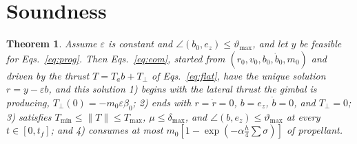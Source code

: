 \documentclass[10pt,letterpaper]{article}
\theoremstyle{aiaa}
\newtheorem{theorem}{Theorem}
\newcommand{\norm}[1]{\lVert #1\rVert}
\newcommand{\ez}{e_z}
\newcommand{\Tmin}{T_{\min}}
\newcommand{\Tmax}{T_{\max}}
\newcommand{\dmax}{\delta_{\max}}
\newcommand{\thmax}{\vartheta_{\max}}
\begin{document}
\section{Soundness}\label{sec:proof}
\begin{theorem}\label{thm:sound}
Assume $\varepsilon$ is constant and $\angle(b_0,\ez)\le\thmax$, and let $y$ be feasible for Eqs.~\eqref{eq:prog}. Then
Eqs.~\eqref{eq:eom}, started from $(r_0,v_0,b_0,\dot b_0,m_0)$ and driven by the thrust $T=T_ab+T_\perp$ of
Eqs.~\eqref{eq:flat}, have the unique solution $r=y-\varepsilon b$, and this solution 1) begins with the lateral thrust the
gimbal is producing, $T_\perp(0)=-m_0\varepsilon\beta_0$; 2) ends with $r=\dot r=0$, $b=\ez$, $\dot b=0$, and $T_\perp=0$;
3) satisfies $\Tmin\le\norm T\le\Tmax$, $\mu\le\dmax$, and $\angle(b,\ez)\le\thmax$ at every $t\in[0,t_f]$; and
4) consumes at most $m_0[1-\exp(-\alpha\tfrac h4\sum\sigma)]$ of propellant.
\end{theorem}
\end{document}
